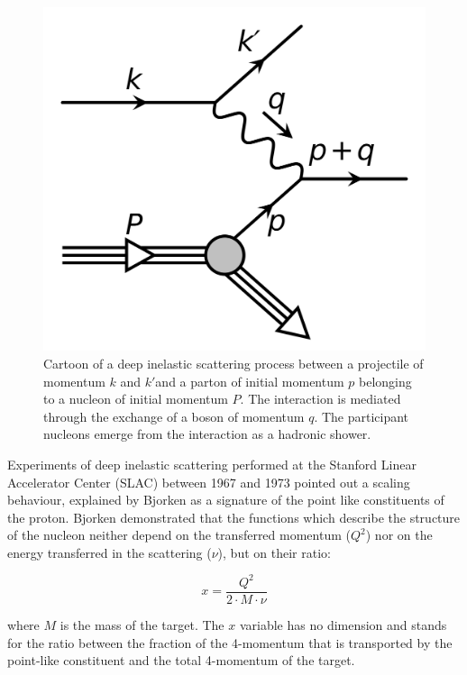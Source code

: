 \begin{figure}[!ht]
\begin{center}
\includegraphics[width=0.5\linewidth]{Chapters/Introduction/Figs/DIS.pdf}
\caption{Cartoon of a deep inelastic scattering process between a projectile of momentum $k$ and $k'$and a parton of initial momentum $p$ belonging to a nucleon of initial momentum $P$. The interaction is mediated through the exchange of a boson of momentum $q$. The participant nucleons emerge from the interaction as a hadronic shower.}
\label{fig:DIS}
\end{center}
\end{figure}

Experiments of deep inelastic scattering performed at the Stanford Linear Accelerator Center (SLAC) between 1967 and 1973 pointed out a scaling behaviour, explained by Bjorken as a signature of the point like constituents of the proton.
Bjorken demonstrated that the functions which describe the structure of the nucleon neither depend on the transferred momentum ($Q^2$) nor on the energy transferred in the scattering ($\nu$), but on their ratio:

\begin{equation}
    x = \frac{Q^2}{2\cdot M \cdot \nu}
\end{equation}

where $M$ is the mass of the target.
The $x$ variable has no dimension and stands for the ratio between the fraction of the 4-momentum that is transported by the point-like constituent and the total 4-momentum of the target.


